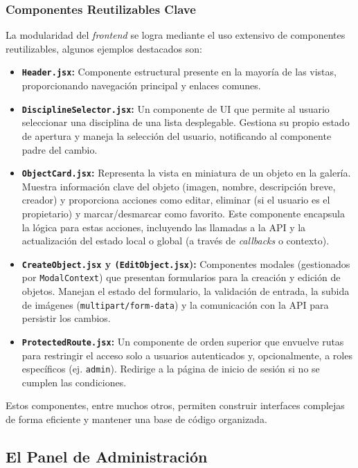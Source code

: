 \subsubsection{Componentes Reutilizables Clave}
\label{sssec:frontendComponentesReutilizables}

La modularidad del \textit{frontend} se logra mediante el uso extensivo de componentes reutilizables, algunos ejemplos destacados son:
\begin{itemize}
    \item \textbf{\texttt{Header.jsx}: } Componente estructural presente en la mayoría de las vistas, proporcionando navegación principal y enlaces comunes.
    \item \textbf{\texttt{DisciplineSelector.jsx}:} Un componente de UI que permite al usuario seleccionar una disciplina de una lista desplegable. Gestiona su propio estado de apertura y maneja la selección del usuario, notificando al componente padre del cambio.
    \item \textbf{\texttt{ObjectCard.jsx}:} Representa la vista en miniatura de un objeto en la galería. Muestra información clave del objeto (imagen, nombre, descripción breve, creador) y proporciona acciones como editar, eliminar (si el usuario es el propietario) y marcar/desmarcar como favorito. Este componente encapsula la lógica para estas acciones, incluyendo las llamadas a la API y la actualización del estado local o global (a través de \textit{callbacks} o contexto).
    \item \textbf{\texttt{CreateObject.jsx} y \texttt{(EditObject.jsx}):} Componentes modales (gestionados por \texttt{ModalContext}) que presentan formularios para la creación y edición de objetos. Manejan el estado del formulario, la validación de entrada, la subida de imágenes (\texttt{multipart/form-data}) y la comunicación con la API para persistir los cambios.
    \item \textbf{\texttt{ProtectedRoute.jsx}:} Un componente de orden superior que envuelve rutas para restringir el acceso solo a usuarios autenticados y, opcionalmente, a roles específicos (ej. \texttt{admin}). Redirige a la página de inicio de sesión si no se cumplen las condiciones.
\end{itemize}

Estos componentes, entre muchos otros, permiten construir interfaces complejas de forma eficiente y mantener una base de código organizada.

\subsection{El Panel de Administración}
\label{ssec:focoAdminDashboard}

